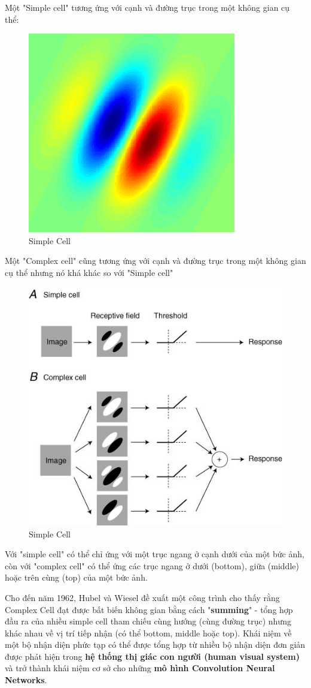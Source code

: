 \documentclass{article}
\begin{document}
	 Một "Simple cell" tương ứng với cạnh và đường trục trong một không gian cụ thể:
	\begin{figure}[H]
		\centering
		\includegraphics[width=0.5\linewidth]{images/simple_cell.png}
		\caption{Simple Cell}
		\label{fig:writing-thesis}
	\end{figure}
	Một "Complex cell" cũng tương ứng với cạnh và đường trục trong một không gian cụ thể nhưng nó khá khác so với "Simple cell"
	\begin{figure}[H]
		\centering
		\includegraphics[width=0.5\linewidth]{images/complex_cell_simple_cell.jpg}
		\caption{Simple Cell}
		\label{fig:writing-thesis}
	\end{figure}
	Với "simple cell" có thể chỉ ứng với một trục ngang ở cạnh dưới của một bức ảnh, còn với "complex cell" có thể ứng các trục ngang ở dưới (bottom), giữa (middle) hoặc trên cùng (top) của một bức ảnh.
	
	Cho đến năm 1962, Hubel và Wiesel đề xuất một công trình cho thấy rằng Complex Cell đạt được bất biến không gian bằng cách "\textbf{summing}" - tổng hợp đầu ra của nhiều simple cell tham chiếu cùng hướng (cùng đường trục) nhưng khác nhau về vị trí tiếp nhận (có thể bottom, middle hoặc top). Khái niệm về một bộ nhận diện phức tạp có thể được tổng hợp từ nhiều bộ nhận diện đơn giản được phát hiện trong \textbf{hệ thống thị giác con người (human visual system)} và trở thành khái niệm cơ sở cho những \textbf{mô hình Convolution Neural Networks}.
	
\end{document}
